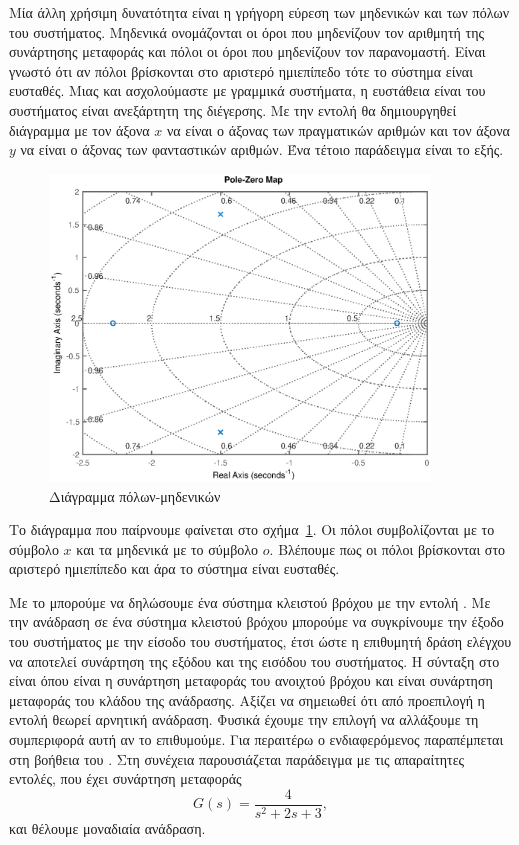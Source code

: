 Μία άλλη χρήσιμη δυνατότητα είναι η γρήγορη εύρεση των μηδενικών και των πόλων
του συστήματος. Μηδενικά ονομάζονται οι όροι που μηδενίζουν τον αριθμητή της
συνάρτησης μεταφοράς και πόλοι οι όροι που μηδενίζουν τον παρανομαστή. Είναι
γνωστό ότι αν πόλοι βρίσκονται στο αριστερό ημιεπίπεδο τότε το σύστημα είναι
ευσταθές. Μιας και ασχολούμαστε με γραμμικά συστήματα, η ευστάθεια είναι
του συστήματος είναι ανεξάρτητη της διέγερσης. Με την εντολή 
θα δημιουργηθεί διάγραμμα με τον άξονα \( x \) να είναι ο άξονας των
πραγματικών αριθμών και τον άξονα \( y \) να είναι ο άξονας των φανταστικών
αριθμών. Ένα τέτοιο παράδειγμα είναι το εξής.
\eng{}
\begin{figure}[h!]
    \centering
    \includegraphics[width=0.9\textwidth]{figures/prelim2.eps}
    \caption{Διάγραμμα πόλων-μηδενικών}
    \label{fig:prelim2}
\end{figure}
Το διάγραμμα που παίρνουμε φαίνεται στο σχήμα~\ref{fig:prelim2}. Οι πόλοι
συμβολίζονται με το σύμβολο \( x \) και τα μηδενικά με το σύμβολο \( o \).
Βλέπουμε πως οι πόλοι βρίσκονται στο αριστερό ημιεπίπεδο και άρα το σύστημα είναι ευσταθές.

Με το  μπορούμε να δηλώσουμε ένα σύστημα κλειστού βρόχου με την
εντολή . Με την ανάδραση σε ένα σύστημα κλειστού βρόχου μπορούμε
να συγκρίνουμε την έξοδο του συστήματος με την είσοδο του συστήματος, έτσι ώστε
η επιθυμητή δράση ελέγχου να αποτελεί συνάρτηση της εξόδου και της εισόδου του
συστήματος. Η σύνταξη στο  είναι
όπου  είναι η συνάρτηση μεταφοράς του ανοιχτού βρόχου και 
είναι συνάρτηση μεταφοράς του κλάδου της ανάδρασης. Αξίζει να σημειωθεί ότι από
προεπιλογή η εντολή  θεωρεί αρνητική ανάδραση. Φυσικά έχουμε την
επιλογή να αλλάξουμε τη συμπεριφορά αυτή αν το επιθυμούμε. Για περαιτέρω ο
ενδιαφερόμενος παραπέμπεται στη βοήθεια του . Στη συνέχεια
παρουσιάζεται παράδειγμα με τις απαραίτητες εντολές, που έχει συνάρτηση μεταφοράς
\[
    G(s) = \frac{4}{s^2 + 2s + 3},
\]
και θέλουμε μοναδιαία ανάδραση.
\eng{}

